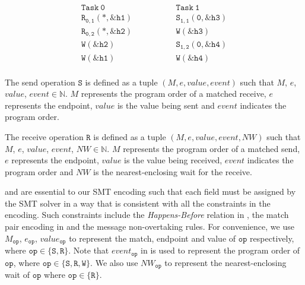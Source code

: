 \[
\begin{array}{l|l}
\;\;\;\;\;\;\;\;\mathtt{Task\ 0}\;\;\;\;\;\;\;\; & \;\;\;\;\;\;\;\; \mathtt{Task\ 1}\;\;\;\;\;\;\;\; \\
\hline
\;\;\;\;\;\;\;\;\mathtt{R_{0,1}(*,\&h1)}\;\;\;\;\;\;\;\; & \;\;\;\;\;\;\;\; \mathtt{S_{1,1}(0,\&h3)}\;\;\;\;\;\;\;\; \\
\;\;\;\;\;\;\;\;\mathtt{R_{0,2}(*,\&h2)}\;\;\;\;\;\;\;\; & \;\;\;\;\;\;\;\; \mathtt{W{(\&h3)}}\;\;\;\;\;\;\;\; \\
\;\;\;\;\;\;\;\;\mathtt{W{(\&h2)}}\;\;\;\;\;\;\;\; & \;\;\;\;\;\;\;\; \mathtt{S_{1,2}(0,\&h4)}\;\;\;\;\;\;\;\; \\
\;\;\;\;\;\;\;\;\mathtt{W{(\&h1)}}\;\;\;\;\;\;\;\; & \;\;\;\;\;\;\;\; \mathtt{W{(\&h4)}}\;\;\;\;\;\;\;\; \\
\end{array}
\]
\begin{definition}
The send operation $\mathtt{S}$ is defined as a tuple $(M,e,value,event)$ such that $\mathit{M}$, $\mathit{e}$, $\mathit{value}$, $\mathit{event}$$ \in \mathbb{N}$. $M$ represents the program order of a matched receive, $e$ represents the endpoint, $value$ is the value being sent and $event$ indicates the program order.
\label{def:snd}
\end{definition}
\begin{definition}
The receive operation $\mathtt{R}$ is defined as a tuple $(M,e,value,event,NW)$ such that $\mathit{M}$, $\mathit{e}$, $\mathit{value}$, $\mathit{event}$, $\mathit{NW}$$ \in \mathbb{N}$. $M$ represents the program order of a matched send, $e$ represents the endpoint, $value$ is the value being received, $event$ indicates the program order and $\mathit{NW}$ is the nearest-enclosing wait for the receive.
\label{def:rcv}
\end{definition}
 and  are essential to our SMT encoding such that each field must be assigned by the SMT solver in a way that is consistent with all the constraints in the encoding. Such constraints include the \emph{Happens-Before} relation in , the match pair encoding in  and the message non-overtaking rules. For convenience, we use $M_{\mathtt{op}}$, $e_{\mathtt{op}}$, $value_{\mathtt{op}}$ to represent the match, endpoint and value of $\mathtt{op}$ respectively, where $\mathtt{op} \in \{\mathtt{S}, \mathtt{R}\}$. Note that $event_{\mathtt{op}}$ in  is used to represent the program order of $\mathtt{op}$, where $\mathtt{op} \in \{\mathtt{S}, \mathtt{R}, \mathtt{W}\}$. We also use $NW_{\mathtt{op}}$ to represent the nearest-enclosing wait of $\mathtt{op}$ where $\mathtt{op} \in \{\mathtt{R}\}$.
